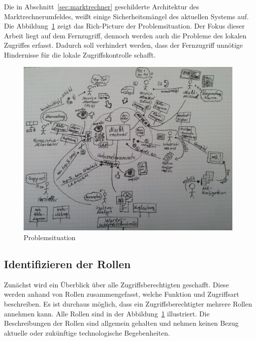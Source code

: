 \documentclass[11pt,a4paper]{report}
\begin{document}
Die in Abschnitt~\ref{sec:marktrechner} geschilderte Architektur des Marktrechnerumfeldes, weißt einige Sicherheitsmängel des aktuellen Systems auf. Die Abbildung~\ref{fig:problem_situation} zeigt das Rich-Picture der Problemsituation. Der Fokus dieser Arbeit liegt auf dem Fernzugriff, dennoch werden auch die Probleme des lokalen Zugriffes erfasst. Dadurch soll verhindert werden, dass der Fernzugriff unnötige Hindernisse für die lokale Zugriffskontrolle schafft. 

\begin{figure}[htb]
\centering
\includegraphics[scale=0.215]{images/problemsituation.jpg}
\caption{Problemsituation}
\label{fig:problem_situation}
\end{figure}

\subsection{Identifizieren der Rollen} \label{sec:roles}

Zunächst wird ein Überblick über alle Zugriffsberechtigten geschafft. Diese werden anhand von Rollen zusammengefasst, welche Funktion und Zugriffsart beschreiben. Es ist durchaus möglich, dass ein Zugriffsberechtigter mehrere Rollen annehmen kann. Alle Rollen sind in der Abbildung~\ref{fig:problem_situation} illustriert. Die Beschreibungen der Rollen sind allgemein gehalten und nehmen keinen Bezug aktuelle oder zukünftige technologische Begebenheiten.
\end{document}
